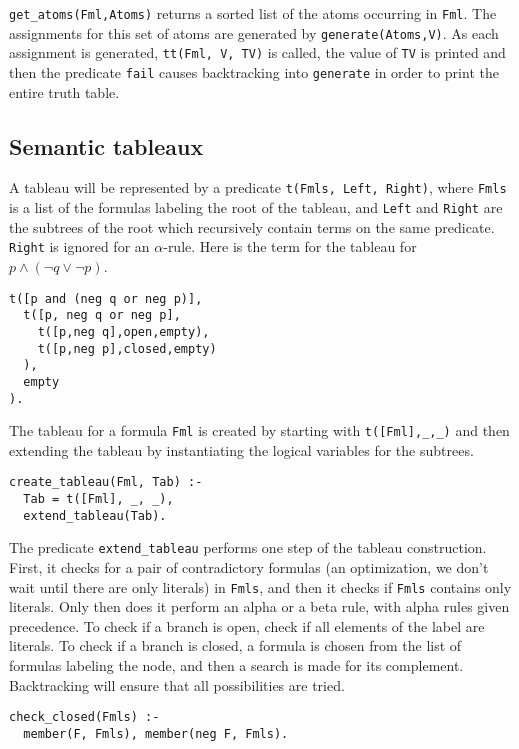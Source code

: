 \documentclass[11pt]{article}
\newcommand*{\p}[1]{\textup{\texttt{#1}}}
\begin{document}
\p{get\_atoms(Fml,Atoms)} returns a sorted list of the atoms occurring
in \p{Fml}. The assignments for this set of atoms are generated by
\p{generate(Atoms,V)}. As each assignment is generated, \p{tt(Fml, V,
TV)} is called, the value of \p{TV} is printed and then the predicate
\p{fail} causes backtracking into \p{generate} in order to print the
entire truth table.



\subsection{Semantic tableaux}\label{s.tabprop}

A tableau will be represented by a predicate \p{t(Fmls, Left, Right)},
where \p{Fmls} is a list of the formulas labeling the root of the
tableau, and \p{Left} and \p{Right} are the subtrees of the root which
recursively contain terms on the same predicate. \p{Right} is ignored
for an $\alpha$-rule. Here is the term for the tableau for $p \wedge
(\neg q \vee \neg p)$.

\begin{verbatim}
t([p and (neg q or neg p)],
  t([p, neg q or neg p],
    t([p,neg q],open,empty),
    t([p,neg p],closed,empty)
  ),
  empty
).
\end{verbatim}

The tableau for a formula \p{Fml} is created by starting with
\p{t([Fml],\_,\_)} and then extending the tableau by instantiating the
logical variables for the subtrees.

\begin{verbatim}
create_tableau(Fml, Tab) :-
  Tab = t([Fml], _, _), 
  extend_tableau(Tab).
\end{verbatim}

The predicate \p{extend\_tableau} performs one step of the tableau
construction. First, it checks for a pair of contradictory formulas (an
optimization, we don't wait until there are only literals) in \p{Fmls},
and then it checks if \p{Fmls} contains only literals. Only then does it
perform an alpha or a beta rule, with alpha rules given precedence. To
check if a branch is open, check if all elements of the label are
literals. To check if a branch is closed, a formula is chosen from the
list of formulas labeling the node, and then a search is made for its
complement. Backtracking will ensure that all possibilities are tried.

\begin{verbatim}
check_closed(Fmls) :-
  member(F, Fmls), member(neg F, Fmls).
\end{verbatim}
\end{document}
